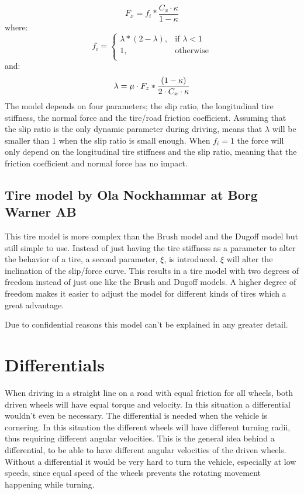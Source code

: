 \begin{equation}
F_{x} = f_{i}*\frac{C_{x} \cdot \kappa}{1-\kappa}
\end{equation}
where:
\begin{equation}
f_{i}=
\begin{cases}
	\lambda*(2-\lambda), & \text{if } \lambda < 1 \\
	1, & \text{otherwise} \\
\end{cases}
\end{equation}
and:
\begin{equation}
	\lambda = \mu \cdot F_{z} * \frac{(1-\kappa)}{2 \cdot C_{x} \cdot \kappa} \\
\end{equation}
The model depends on four parameters; the slip ratio, the longitudinal tire stiffness, the normal force and the tire/road friction coefficient. Assuming that the slip ratio is the only dynamic parameter during driving, means that $ \lambda $ will be smaller than 1 when the slip ratio is small enough. When $ f_{i} = 1 $ the force will only depend on the longitudinal tire stiffness and the slip ratio, meaning that the friction coefficient and normal force has no impact. 

\subsection{Tire model by Ola Nockhammar at Borg Warner AB}
This tire model is more complex than the Brush model and the Dugoff model but still simple to use. Instead of just having the tire stiffness as a parameter to alter the behavior of a tire, a second parameter, $ \xi $, is introduced. $ \xi $ will alter the inclination of the slip/force curve. This results in a tire model with two degrees of freedom instead of just one like the Brush and Dugoff models. A higher degree of freedom makes it easier to adjust the model for different kinds of tires which a great advantage.

Due to confidential reasons this model can't be explained in any greater detail.   

\section{Differentials}
When driving in a straight line on a road with equal friction for all wheels, both driven wheels will have equal torque and velocity. In this situation a differential wouldn't even be necessary. The differential is needed when the vehicle is cornering. In this situation the different wheels will have different turning radii, thus requiring different angular velocities. This is the general idea behind a differential, to be able to have different angular velocities of the driven wheels. Without a differential it would be very hard to turn the vehicle, especially at low speeds, since equal speed of the wheels prevents the rotating movement happening while turning.

